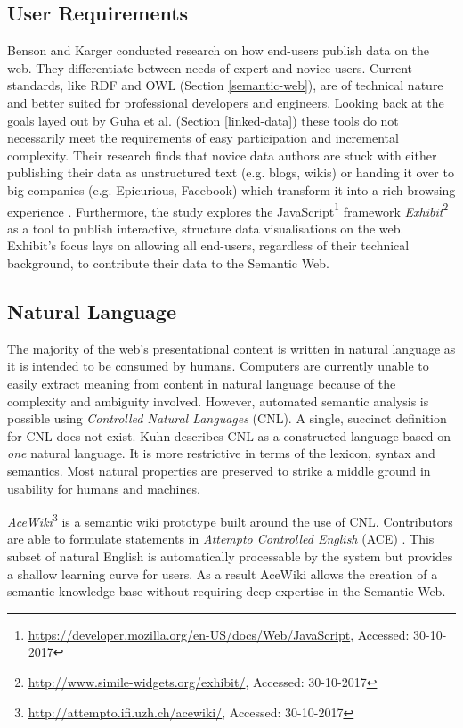 \subsection{User Requirements}
Benson and Karger \cite{Benson2014b} conducted research on how end-users publish data on the web.
They differentiate between needs of expert and novice users. 
Current standards, like RDF and OWL (Section \ref{semantic-web}), are of technical nature and better suited for professional developers and engineers.
Looking back at the goals layed out by Guha et al. \cite{Guha2015b} (Section \ref{linked-data}) these tools do not necessarily meet the requirements of easy participation and incremental complexity.
Their research finds that novice data authors are stuck with either publishing their data as unstructured text (e.g. blogs, wikis) or handing it over to big companies (e.g. Epicurious, Facebook) which transform it into a rich browsing experience \cite{Benson2014b}.
Furthermore, the study explores the JavaScript\footnote{\url{https://developer.mozilla.org/en-US/docs/Web/JavaScript}, Accessed: 30-10-2017} framework \textit{Exhibit}\footnote{\url{http://www.simile-widgets.org/exhibit/}, Accessed: 30-10-2017} as a tool to publish interactive, structure data visualisations on the web.
Exhibit's focus lays on allowing all end-users, regardless of their technical background, to contribute their data to the Semantic Web.

\subsection{Natural Language} \label{natural-language}
The majority of the web's presentational content is written in natural language as it is intended to be consumed by humans.
Computers are currently unable to easily extract meaning from content in natural language because of the complexity and ambiguity involved.
However, automated semantic analysis is possible using \textit{Controlled Natural Languages} (CNL).
A single, succinct definition for CNL does not exist.
Kuhn \cite{Kuhn2013ALanguages} describes CNL as a constructed language based on \textit{one} natural language.
It is more restrictive in terms of the lexicon, syntax and semantics.
Most natural properties are preserved to strike a middle ground in usability for humans and machines.

\textit{AceWiki}\footnote{\url{http://attempto.ifi.uzh.ch/acewiki/}, Accessed: 30-10-2017} is a semantic wiki prototype built around the use of CNL.
Contributors are able to formulate statements in \textit{Attempto Controlled English} (ACE) \cite{Kuhn2009AceWiki:Wiki}.
This subset of natural English is automatically processable by the system but provides a shallow learning curve for users.
As a result AceWiki allows the creation of a semantic knowledge base without requiring deep expertise in the Semantic Web.

